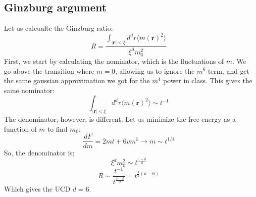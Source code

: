 \documentclass{article}
\begin{document}
\subsection{Ginzburg argument}
Let us calcualte the Ginzburg ratio:
\begin{equation}
    R = \frac{\int_{|\boldsymbol{r}| < \xi} d^dr\langle m(\boldsymbol{r})^2 \rangle}{\xi^d m_0^2}
\end{equation}
First, we start by calculating the nominator, which is the fluctuations of $m$. We go above the transition where $m = 0$, allowing us to ignore the $m^6$ term, and get the same gaussian approximation we got for the $m^4$ power in class. This gives the same nominator:
\begin{equation}
    \int_{|\boldsymbol{r}| < \xi} d^dr\langle m(\boldsymbol{r})^2 \rangle \sim t^{-1}
\end{equation}
The denominator, however, is different. Let us minimize the free energy as a function of $m$ to find $m_0$:
\begin{equation}
    \frac{dF}{dm} = 2mt + 6vm^5 \rightarrow m \sim t^{1/4}
\end{equation}
So, the denominator is:
\begin{equation}
    \xi^d m_0^2 \sim t^{\frac{1 - d}{2}}
\end{equation}
\begin{equation}
    R \sim \frac{t^{-1}}{t^{\frac{1 - d}{2}}} = t^{\frac{1}{2}(d - 6)}
\end{equation}
Which gives the UCD $d = 6$.
\end{document}

